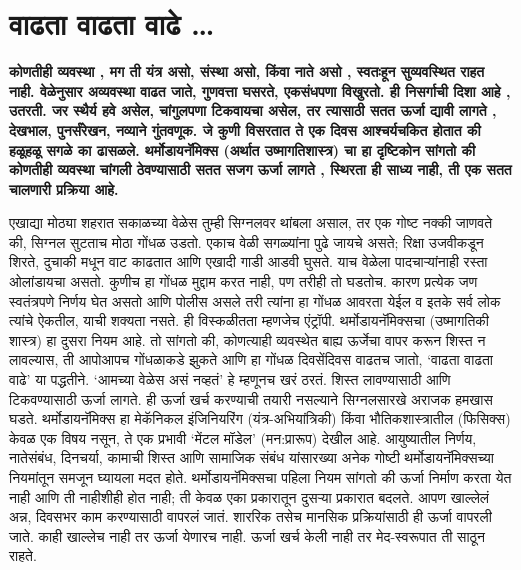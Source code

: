 \chapter{वाढता वाढता वाढे …}

\textcolor{blue!60!black}{\textbf{कोणतीही व्यवस्था , मग ती यंत्र असो, संस्था असो, किंवा नाते असो , स्वतःहून सुव्यवस्थित राहत नाही. वेळेनुसार अव्यवस्था वाढत जाते, गुणवत्ता घसरते, एकसंधपणा विखुरतो. ही निसर्गाची दिशा आहे , उतरती. जर स्थैर्य हवे असेल, चांगुलपणा टिकवायचा असेल, तर त्यासाठी सतत ऊर्जा द्यावी लागते , देखभाल, पुनर्संरेखन, नव्याने गुंतवणूक. जे कुणी विसरतात ते एक दिवस आश्चर्यचकित होतात की हळूहळू सगळे का ढासळले. थर्मोडायनॅमिक्स (अर्थात उष्मागतिशास्त्र) चा हा दृष्टिकोन सांगतो की कोणतीही व्यवस्था चांगली ठेवण्यासाठी सतत सजग ऊर्जा लागते , स्थिरता ही साध्य नाही, ती एक सतत चालणारी प्रक्रिया आहे.}}

एखाद्या मोठ्या शहरात सकाळच्या वेळेस तुम्ही सिग्नलवर थांबला असाल, तर एक गोष्ट नक्की जाणवते की, सिग्नल सुटताच मोठा गोंधळ उडतो. एकाच वेळी सगळ्यांना पुढे जायचे असते; रिक्षा उजवीकडून शिरते, दुचाकी मधून वाट काढतात आणि एखादी गाडी आडवी घुसते. याच वेळेला पादचाऱ्यांनाही रस्ता ओलांडायचा असतो. कुणीच हा गोंधळ मुद्दाम करत नाही, पण तरीही तो घडतोच. कारण प्रत्येक जण स्वतंत्रपणे निर्णय घेत असतो आणि पोलीस असले तरी त्यांना हा गोंधळ आवरता येईल व इतके सर्व लोक त्यांचे ऐकतील, याची शक्यता नसते. ही विस्कळीतता म्हणजेच एंट्रॉपी. थर्मोडायनॅमिक्सचा (उष्मागतिकी शास्त्र) हा दुसरा नियम आहे. तो सांगतो की, कोणत्याही व्यवस्थेत बाह्य ऊर्जेचा वापर करून शिस्त न लावल्यास, ती आपोआपच गोंधळाकडे झुकते आणि हा गोंधळ दिवसेंदिवस वाढतच जातो, ‘वाढता वाढता वाढे’ या पद्धतीने. ‘आमच्या वेळेस असं नव्हतं’ हे म्हणूनच खरं ठरतं. शिस्त लावण्यासाठी आणि टिकवण्यासाठी ऊर्जा लागते. ही ऊर्जा खर्च करण्याची तयारी नसल्याने सिग्नलसारखे अराजक हमखास घडते.
थर्मोडायनॅमिक्स हा मेकॅनिकल इंजिनियरिंग (यंत्र-अभियांत्रिकी) किंवा भौतिकशास्त्रातील (फिसिक्स) केवळ एक विषय नसून, ते एक प्रभावी ‘मेंटल मॉडेल’ (मन:प्रारूप) देखील आहे. आयुष्यातील निर्णय, नातेसंबंध, दिनचर्या, कामाची शिस्त आणि सामाजिक संबंध यांसारख्या अनेक गोष्टी थर्मोडायनॅमिक्सच्या नियमांतून समजून घ्यायला मदत होते.
थर्मोडायनॅमिक्सचा पहिला नियम सांगतो की ऊर्जा निर्माण करता येत नाही आणि ती नाहीशीही होत नाही; ती केवळ एका प्रकारातून दुसऱ्या प्रकारात बदलते.
आपण खाल्लेलं अन्न, दिवसभर काम करण्यासाठी वापरलं जातं. शाररिक तसेच मानसिक प्रक्रियांसाठी ही ऊर्जा वापरली जाते. काही खाल्लेच नाही तर ऊर्जा येणारच नाही. ऊर्जा खर्च केली नाही तर मेद-स्वरूपात ती साठून राहते. 

